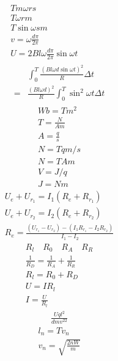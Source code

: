 \documentclass{article}
\begin{document}
  \begin{gather*}
    T m \omega r s \\
    T \omega r m \\
    T \sin{\omega s} m \\
    v = \omega\frac{d\pi}{2\pi} \\
    U = 2 B l \omega\frac{d\pi}{2\pi} \sin{\omega t} \\
    \begin{aligned}
      & \int_0^T \frac{(Bl \omega d \sin{\omega t})^2}{R} \Delta t \\
      = & \frac{(Bl\omega d)^2}{R} \int_{0}^{T} \sin^2 \omega t \Delta t
    \end{aligned}
  \end{gather*}
  \begin{gather*}
    Wb = Tm^2 \\
    T = \frac{N}{Am} \\
    A = \frac{q}{s} \\
    N = Tqm/s \\
    N = TAm \\
    V = J/q \\
    J = Nm
  \end{gather*}
  \begin{gather*}
    U_e + U_{r_1} = I_1(R_e + R_{r_1}) \\
    U_e + U_{r_2} = I_2(R_e + R_{r_2}) \\
    R_e = \frac{( U_{r_1} - U_{r_2} ) - ( I_1 R_{r_1} - I_2 R_{r_2} )}{I_1 - I_2}
  \end{gather*}
  \begin{gather*}
    R_l \quad R_0 \quad R_A \quad R_R \\
    \frac{1}{R_D} = \frac{1}{R_A} + \frac{1}{R_R} \\
    R_l = R_0 + R_D \\
    U = IR_l \\
    I = \frac{U}{R_l}
  \end{gather*}
  \begin{gather*}
    \frac{Uql^2}{dmv ^22}
  \end{gather*}
  \begin{gather*}
    l_{n} = Tv_{n} \\
    v_{n} = \sqrt{\frac{2nW}{m}}
  \end{gather*}
\end{document}
